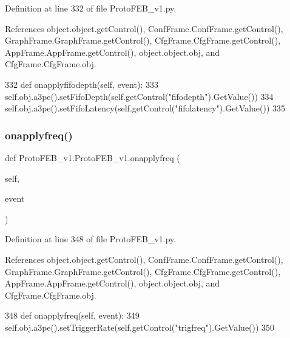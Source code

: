 Definition at line 332 of file Proto\+F\+E\+B\+\_\+v1.\+py.



References object.\+object.\+get\+Control(), Conf\+Frame.\+Conf\+Frame.\+get\+Control(), Graph\+Frame.\+Graph\+Frame.\+get\+Control(), Cfg\+Frame.\+Cfg\+Frame.\+get\+Control(), App\+Frame.\+App\+Frame.\+get\+Control(), object.\+object.\+obj, and Cfg\+Frame.\+Cfg\+Frame.\+obj.


\begin{DoxyCode}
332     \textcolor{keyword}{def }onapplyfifodepth(self, event):
333         self.obj.a3pe().setFifoDepth(self.getControl(\textcolor{stringliteral}{"fifodepth"}).GetValue())
334         self.obj.a3pe().setFifoLatency(self.getControl(\textcolor{stringliteral}{"fifolatency"}).GetValue())
335 
\end{DoxyCode}
\mbox{\label{classProtoFEB__v1_1_1ProtoFEB__v1_ac654ad0cdb32adcdb9a649ead2473739}} 
\subsubsection{\texorpdfstring{onapplyfreq()}{onapplyfreq()}}
{\footnotesize\ttfamily def Proto\+F\+E\+B\+\_\+v1.\+Proto\+F\+E\+B\+\_\+v1.\+onapplyfreq (\begin{DoxyParamCaption}\item[{}]{self,  }\item[{}]{event }\end{DoxyParamCaption})}



Definition at line 348 of file Proto\+F\+E\+B\+\_\+v1.\+py.



References object.\+object.\+get\+Control(), Conf\+Frame.\+Conf\+Frame.\+get\+Control(), Graph\+Frame.\+Graph\+Frame.\+get\+Control(), Cfg\+Frame.\+Cfg\+Frame.\+get\+Control(), App\+Frame.\+App\+Frame.\+get\+Control(), object.\+object.\+obj, and Cfg\+Frame.\+Cfg\+Frame.\+obj.


\begin{DoxyCode}
348     \textcolor{keyword}{def }onapplyfreq(self, event):
349         self.obj.a3pe().setTriggerRate(self.getControl(\textcolor{stringliteral}{"trigfreq"}).GetValue())
350 
\end{DoxyCode}
\mbox{\label{classProtoFEB__v1_1_1ProtoFEB__v1_aadcdf53a503962a44439327ee7819de7}} 
